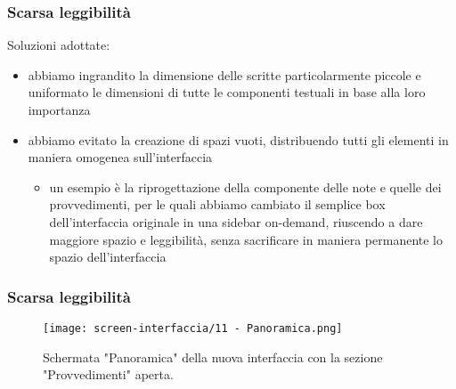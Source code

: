 \begin{frame}
    \label{f:scarsa-leggibilita}
    \frametitle{Scarsa leggibilità}    
    Soluzioni adottate: 
    \begin{itemize}
        \item<1-> abbiamo ingrandito la dimensione delle scritte particolarmente piccole e uniformato le dimensioni di tutte le componenti testuali in base alla loro importanza
        \item<2-> abbiamo evitato la creazione di spazi vuoti, distribuendo tutti gli elementi in maniera omogenea sull'interfaccia
        \begin{itemize}
            \item<2-> un esempio è la riprogettazione della componente delle note e quelle dei provvedimenti, per le quali abbiamo cambiato il semplice box dell'interfaccia originale in una sidebar on-demand, riuscendo a dare maggiore spazio e leggibilità, senza sacrificare in maniera permanente lo spazio dell'interfaccia
        \end{itemize}
    \end{itemize}    

\end{frame}

\begin{frame}
    \frametitle{Scarsa leggibilità}
    \begin{figure}
        \centering
        \texttt{[image: screen-interfaccia/11 - Panoramica.png]}
        \caption{Schermata "Panoramica" della nuova interfaccia con la sezione "Provvedimenti" aperta.}
    \end{figure}
\end{frame}

